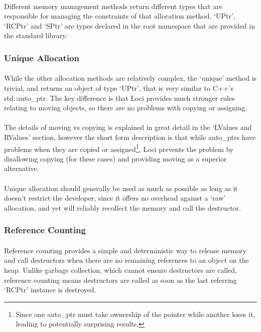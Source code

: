 \documentclass[12pt,twoside,notitlepage]{report}
\begin{document}
\paragraph{}
Different memory management methods return different types that are responsible for managing the constraints of that allocation method. `UPtr', `RCPtr' and `SPtr' are types declared in the root namespace that are provided in the standard library.

\subsubsection{Unique Allocation}

\paragraph{}
While the other allocation methods are relatively complex, the `unique' method is trivial, and returns an object of type `UPtr', that is very similar to C++'s std::auto\_ptr. The key difference is that Loci provides much stronger rules relating to moving objects, so there are no problems with copying or assigning.

\paragraph{}
The details of moving vs copying is explained in great detail in the `LValues and RValues' section, however the short form description is that while auto\_ptrs have problems when they are copied or assigned\footnote{Since one auto\_ptr must take ownership of the pointer while another loses it, leading to potentially surprising results.}, Loci prevents the problem by disallowing copying (for these cases) and providing moving as a superior alternative.

\paragraph{}
Unique allocation should generally be used as much as possible as long as it doesn't restrict the developer, since it offers no overhead against a `raw' allocation, and yet will reliably recollect the memory and call the destructor.

\subsubsection{Reference Counting}

\paragraph{}
Reference counting provides a simple and deterministic way to release memory and call destructors when there are no remaining references to an object on the heap. Unlike garbage collection, which cannot ensure destructors are called, reference counting means destructors are called as soon as the last referring `RCPtr' instance is destroyed.
\end{document}
